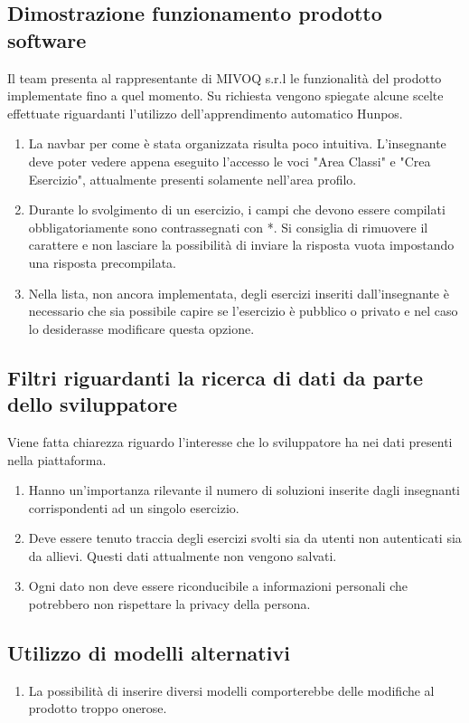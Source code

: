 \documentclass[11pt,a4paper]{article}
\begin{document}
	\subsection{Dimostrazione funzionamento prodotto software}
	Il team presenta al rappresentante di MIVOQ s.r.l le funzionalità del prodotto implementate fino a quel momento.
	Su richiesta vengono spiegate alcune scelte effettuate riguardanti l'utilizzo dell'apprendimento automatico Hunpos.
	\begin{enumerate}
		\item La navbar per come è stata organizzata risulta poco intuitiva. L'insegnante deve poter vedere appena eseguito l'accesso le voci "Area Classi" e "Crea Esercizio", attualmente presenti solamente nell'area profilo.
		\item Durante lo svolgimento di un esercizio, i campi che devono essere compilati obbligatoriamente sono contrassegnati con *. Si consiglia di rimuovere il carattere e non lasciare la possibilità di inviare la risposta vuota impostando una risposta precompilata. 
		\item Nella lista, non ancora implementata, degli esercizi inseriti dall'insegnante è necessario che sia possibile capire se l'esercizio è pubblico o privato e nel caso lo desiderasse modificare questa opzione.
	\end{enumerate}
	
	\subsection{Filtri riguardanti la ricerca di dati da parte dello sviluppatore}
	Viene fatta chiarezza riguardo l'interesse che lo sviluppatore ha nei dati presenti nella piattaforma.
	\begin{enumerate}
		\item Hanno un'importanza rilevante il numero di soluzioni  inserite dagli insegnanti corrispondenti ad un singolo esercizio.
		\item Deve essere tenuto traccia degli esercizi svolti sia da utenti non autenticati sia da allievi. Questi dati attualmente non vengono salvati.
		\item Ogni dato non deve essere riconducibile a informazioni personali che potrebbero non rispettare la privacy della persona.
	\end{enumerate}     
	
	\subsection{Utilizzo di modelli alternativi}
	\begin{enumerate}
		\item La possibilità di inserire diversi modelli comporterebbe delle modifiche al prodotto troppo onerose. 
	\end{enumerate} 
	
\end{document}
